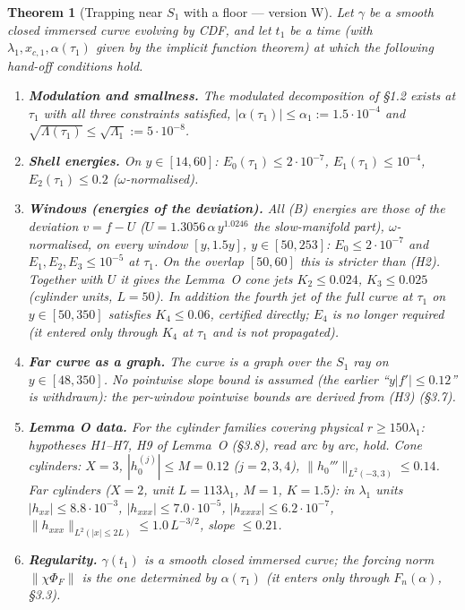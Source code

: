 \documentclass[11pt]{article}
\newtheorem{theorem}{Theorem}
\theoremstyle{definition}
\theoremstyle{remark}
\newcommand{\norm}[1]{\lVert #1\rVert}
\begin{document}
\begin{theorem}[Trapping near $S_1$ with a floor --- version W]\label{thm:W}
Let $\gamma$ be a smooth closed \emph{immersed} curve evolving by CDF, and let $t_1$ be a time (with $\lambda_1,x_{c,1},\alpha(\tau_1)$ given by the implicit function theorem) at which the following hand-off conditions hold.
\begin{enumerate}[label=\textup{(H\arabic*)},leftmargin=*]
\item \textbf{Modulation and smallness.} The modulated decomposition of \S1.2 exists at $\tau_1$ with all three constraints satisfied, $|\alpha(\tau_1)|\le\alpha_1:=1.5\cdot10^{-4}$ and $\sqrt{\Lambda(\tau_1)}\le\sqrt{\Lambda_1}:=5\cdot10^{-8}$.
\item \textbf{Shell energies.} On $y\in[14,60]$: $E_0(\tau_1)\le2\cdot10^{-7}$, $E_1(\tau_1)\le10^{-4}$, $E_2(\tau_1)\le0.2$ ($\omega$-normalised).
\item \textbf{Windows (energies of the deviation).} All (B) energies are those of the \emph{deviation} $v=f-U$ ($U=1.3056\,\alpha\,y^{1.0246}$ the slow-manifold part), $\omega$-normalised, on every window $[y,1.5y]$, $y\in[50,253]$: $E_0\le2\cdot10^{-7}$ and $E_1,E_2,E_3\le10^{-5}$ at $\tau_1$. On the overlap $[50,60]$ this is stricter than (H2). Together with $U$ it gives the Lemma~O cone jets $K_2\le0.024$, $K_3\le0.025$ (cylinder units, $L=50$). In addition the fourth jet of the full curve at $\tau_1$ on $y\in[50,350]$ satisfies $K_4\le0.06$, \emph{certified directly}; $E_4$ is no longer required (it entered only through $K_4$ at $\tau_1$ and is not propagated).
\item \textbf{Far curve as a graph.} The curve is a graph over the $S_1$ ray on $y\in[48,350]$. No pointwise slope bound is assumed (the earlier ``$y|f'|\le0.12$'' is withdrawn): the per-window pointwise bounds are \emph{derived} from (H3) (\S3.7).
\item \textbf{Lemma O data.} For the cylinder families covering physical $r\ge150\lambda_1$: hypotheses H1--H7, H9 of Lemma~O (\S3.8), read arc by arc, hold. Cone cylinders: $X=3$, $|h_0^{(j)}|\le M=0.12$ ($j=2,3,4$), $\norm{h_0'''}_{L^2(-3,3)}\le0.14$. Far cylinders ($X=2$, unit $L=113\lambda_1$, $M=1$, $K=1.5$): in $\lambda_1$ units $|h_{xx}|\le8.8\cdot10^{-3}$, $|h_{xxx}|\le7.0\cdot10^{-5}$, $|h_{xxxx}|\le6.2\cdot10^{-7}$, $\norm{h_{xxx}}_{L^2(|x|\le2L)}\le1.0\,L^{-3/2}$, slope $\le0.21$.
\item \textbf{Regularity.} $\gamma(t_1)$ is a smooth closed immersed curve; the forcing norm $\norm{\chi\Phi_F}$ is the one determined by $\alpha(\tau_1)$ (it enters only through $F_n(\alpha)$, \S3.3).

\end{enumerate}
\end{theorem}
\end{document}
